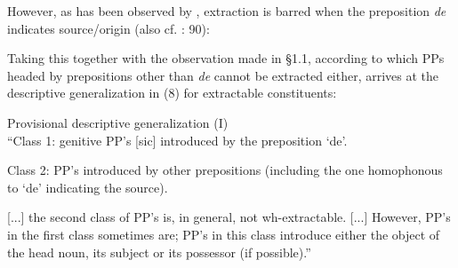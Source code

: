 \documentclass[output=paper]{langsci/langscibook}
\begin{document}
However, as has been observed by \citet[225]{Sportiche1981}, extraction is barred when the preposition \textit{de} indicates source/origin (also cf. \citealt{Tellier1991}: 90):

\ea%
    \label{ex:mensch:7}
    \z
\z

Taking this together with the observation made in §1.1, according to which PPs headed by prepositions other than \textit{de} cannot be extracted either, \citet{Sportiche1981} arrives at the descriptive generalization in (8) for extractable constituents:

\begin{exe}
\ex%
\label{ex:mensch:8}
Provisional descriptive generalization (I)\\
\noindent “Class 1: genitive PP’s [sic] introduced by the preposition ‘de’.

Class 2: PP’s introduced by other prepositions (including the one homophonous to ‘de’ indicating the source).

[...] the second class of PP’s is, in general, not wh-extractable. [...] However, PP’s in the first class sometimes are; PP’s in this class introduce either the object of the head noun, its subject or its possessor (if possible).” \citep[225]{Sportiche1981}
\end{exe}
\end{document}
